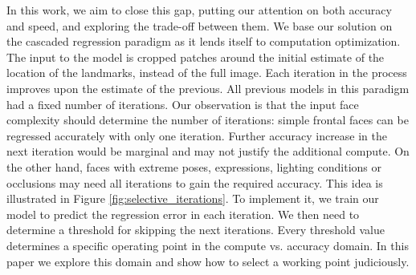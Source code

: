 \documentclass[9pt,twocolumn]{extarticle}
\begin{document}
In this work, we aim to close this gap, putting our attention on both accuracy and speed, and exploring the trade-off between them. We base our solution on the cascaded regression paradigm as it lends itself to computation optimization. The input to the model is cropped patches around the initial estimate of the location of the landmarks, instead of the full image. Each iteration in the process improves upon the estimate of the previous. All previous models in this paradigm had a fixed number of iterations. Our observation is that the input face complexity should determine the number of iterations: simple frontal faces can be regressed accurately with only one iteration.
Further accuracy increase in the next iteration would be marginal and may not justify the additional compute. On the other hand, faces with extreme poses, expressions, lighting conditions or occlusions may need all iterations to gain the required accuracy. This idea is illustrated in Figure \ref{fig:selective_iterations}. To implement it, we train our model to predict the regression error in each iteration. We then need to determine a threshold for skipping the next iterations. Every threshold value determines a specific operating point in the compute vs. accuracy domain. In this paper we explore this domain and show how to select a working point judiciously.
\end{document}
